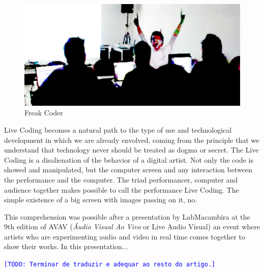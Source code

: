 \documentclass[letterpaper, 12pt]{article}
\newcommand{\inote}[1]{\textcolor{blue}{\texttt{\footnotesize[#1]}}}
\newcommand{\todo}[1]{\inote{TODO: #1}}
\begin{document}
\begin{figure}[htpb]
  \begin{center}
    \includegraphics[scale=.4]{img/fig_freakcoder.png}
    \caption{Freak Coder}
    \label{fig:freakcoder}
  \end{center}
\end{figure}

Live Coding becomes a natural path to the type of use and
technological development in which we are already envolved, coming
from the principle that we understand that technology never should be
treated as dogma or secret. The Live Coding is a disalienation of the
behavior of a digital artist. Not only the code is showed and
manipulated, but the computer screen and any interaction between the
performance and the computer. The triad performancer, computer and
audience together makes possible to call the performance Live
Coding. The simple existence of a big screen with images passing on
it, no.  

This comprehension was possible after a presentation by LabMacambira
at the 9th edition of AVAV (\textit{\'{A}udio Visual Ao Vivo} or Live
Audio Visual) an event where artists who are experimenting audio and
video in real time comes together to show their works. In this
presentation...

\todo{Terminar de traduzir e adequar ao resto do artigo.}

\end{document}
